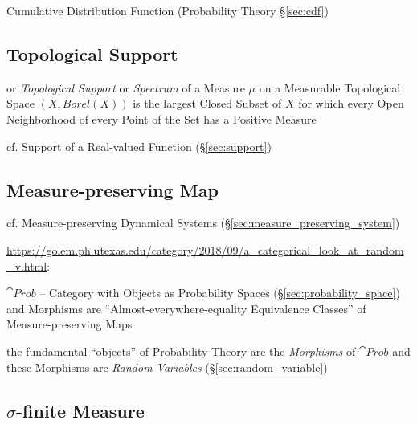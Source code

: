 \fist Cumulative Distribution Function (Probability Theory \S\ref{sec:cdf})



\subsection{Topological Support}\label{sec:topological_support}

or \emph{Topological Support} or \emph{Spectrum} of a Measure $\mu$ on a
Measurable Topological Space $(\xspace{X}, Borel(\xspace{X}))$ is the largest
Closed Subset of $\xspace{X}$ for which every Open Neighborhood of every Point
of the Set has a Positive Measure

cf. Support of a Real-valued Function (\S\ref{sec:support})



\subsection{Measure-preserving Map}\label{sec:measure_preserving_map}

cf. Measure-preserving Dynamical Systems (\S\ref{sec:measure_preserving_system})

\url{https://golem.ph.utexas.edu/category/2018/09/a_categorical_look_at_random_v.html}:

$\cat{Prob}$ -- Category with Objects as Probability Spaces
(\S\ref{sec:probability_space}) and Morphisms are ``Almost-everywhere-equality
Equivalence Classes'' of Measure-preserving Maps

the fundamental ``objects'' of Probability Theory are the \emph{Morphisms} of
$\cat{Prob}$ and these Morphisms are \emph{Random Variables}
(\S\ref{sec:random_variable})



\subsection{$\sigma$-finite Measure}\label{sec:sigma_finite}

